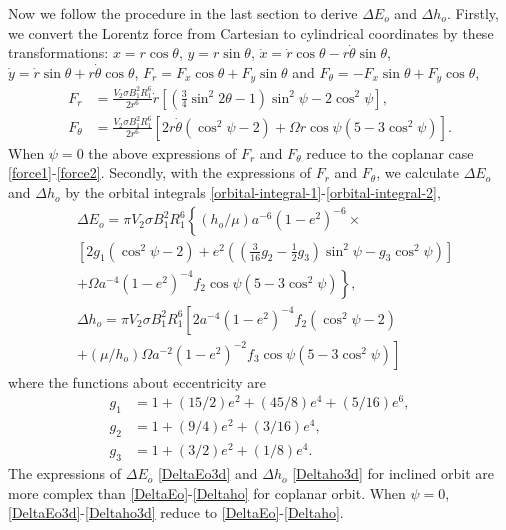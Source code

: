 \documentclass[twocolumn,linenumbers]{aastex631}
\begin{document}
Now we follow the procedure in the last section to derive $\Delta E_o$ and $\Delta h_o$. Firstly, we convert the Lorentz force from Cartesian to cylindrical coordinates by these transformations: $x=r\cos\theta$, $y=r\sin\theta$, $\dot x=\dot r\cos\theta-r\dot\theta\sin\theta$, $\dot y=\dot r\sin\theta+r\dot\theta\cos\theta$, $F_r=F_x\cos\theta+F_y\sin\theta$ and $F_\theta=-F_x\sin\theta+F_y\cos\theta$,
\begin{align}
F_r &= \frac{V_2\sigma B_1^2R_1^6}{2r^6} \dot r \left[ \left(\frac{3}{4}\sin^2 2\theta-1\right)\sin^2\psi-2\cos^2\psi \right],  \\
F_\theta &= \frac{V_2\sigma B_1^2R_1^6}{2r^6} \left[ 2r\dot\theta(\cos^2\psi-2)+\Omega r\cos\psi(5-3\cos^2\psi) \right].
\end{align}
When $\psi=0$ the above expressions of $F_r$ and $F_\theta$ reduce to the coplanar case \eqref{force1}-\eqref{force2}. Secondly, with the expressions of $F_r$ and $F_\theta$, we calculate $\Delta E_o$ and $\Delta h_o$ by the orbital integrals \eqref{orbital-integral-1}-\eqref{orbital-integral-2},
\begin{align}
& \Delta E_o = \pi V_2\sigma B_1^2R_1^6 \left\{ (h_o/\mu)a^{-6}(1-e^2)^{-6}\times \right. \nonumber \\
& \left[ 2g_1(\cos^2\psi-2)+e^2\left(\left(\frac{3}{16}g_2-\frac{1}{2}g_3\right)\sin^2\psi-g_3\cos^2\psi\right) \right] \nonumber \\
& \left. +\Omega a^{-4}(1-e^2)^{-4}f_2\cos\psi(5-3\cos^2\psi) \right\}, \label{DeltaEo3d} \\
& \Delta h_o = \pi V_2\sigma B_1^2R_1^6 \left[ 2a^{-4}(1-e^2)^{-4}f_2(\cos^2\psi-2) \right. \nonumber \\
& \left. +(\mu/h_o)\Omega a^{-2}(1-e^2)^{-2}f_3\cos\psi(5-3\cos^2\psi) \right] \label{Deltaho3d}
\end{align}
where the functions about eccentricity are
\begin{align}
g_1 & = 1+(15/2)e^2+(45/8)e^4+(5/16)e^6,  \\
g_2 & = 1+(9/4)e^2+(3/16)e^4, \\
g_3 & = 1+(3/2)e^2+(1/8)e^4.
\end{align}
The expressions of $\Delta E_o$ \eqref{DeltaEo3d} and $\Delta h_o$ \eqref{Deltaho3d} for inclined orbit are more complex than \eqref{DeltaEo}-\eqref{Deltaho} for coplanar orbit. When $\psi=0$, \eqref{DeltaEo3d}-\eqref{Deltaho3d} reduce to \eqref{DeltaEo}-\eqref{Deltaho}.
\end{document}
